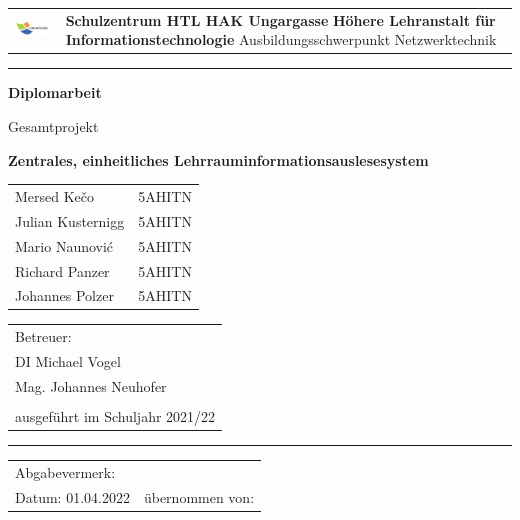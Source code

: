 \setlength{\TPHorizModule}{10mm}
\setlength{\TPVertModule}{10mm}
\textblockorigin{0cm}{0cm}

\begin{titlepage}
    \begin{tabular}{p{2.5cm}p{}}
        \vspace{4mm}
        \includegraphics[width=2.5cm]{media/Ungargasse_Logo.png} &
        \centering
        {\Large \textbf{Schulzentrum HTL HAK Ungargasse} \vspace{5mm}} \newline
        \textbf{Höhere Lehranstalt für Informationstechnologie} \newline
        Ausbildungsschwerpunkt Netzwerktechnik 
        \end{tabular}
        \vspace{5mm}
        \hrule
    \begin{center}
    \vspace{2cm}
    \begin{huge}
        \textbf{Diplomarbeit}
        
        {\LARGE Gesamtprojekt}

        \begin{onehalfspace}
            \textbf{Zentrales, einheitliches Lehrraum\-informations\-auslesesystem}
        \end{onehalfspace}
    \end{huge}
    \vspace{1cm}
    \begin{tabular}{p{}p{}}
        Mersed Kečo & 5AHITN\\
        Julian Kusternigg & 5AHITN\\
        Mario Naunović & 5AHITN\\
        Richard Panzer & 5AHITN\\
        Johannes Polzer & 5AHITN\\
    \end{tabular}
\end{center}
\vfill
\begin{tabular}{l}
    Betreuer:\\
    DI Michael Vogel\\
    Mag. Johannes Neuhofer\\\\
    ausgeführt im Schuljahr 2021/22\\
\end{tabular}
\vspace{1cm}
\hrule
    \begin{tabular}{p{}l}
        
        Abgabevermerk: &      \\     
        
        Datum: 01.04.2022 & übernommen von: 
    \end{tabular}
\end{titlepage}